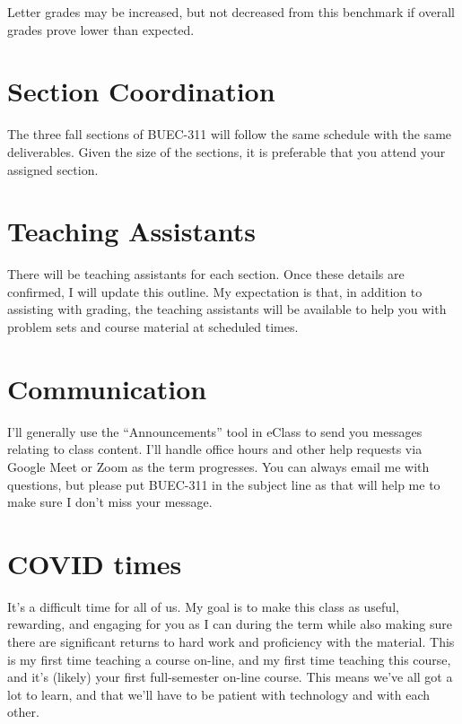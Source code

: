 \documentclass[11pt,]{article}
\begin{document}
Letter grades may be increased, but not decreased from this benchmark if
overall grades prove lower than expected.

\hypertarget{section-coordination}{%
\section{Section Coordination}\label{section-coordination}}

The three fall sections of BUEC-311 will follow the same schedule with
the same deliverables. Given the size of the sections, it is preferable
that you attend your assigned section.

\hypertarget{teaching-assistants}{%
\section{Teaching Assistants}\label{teaching-assistants}}

There will be teaching assistants for each section. Once these details
are confirmed, I will update this outline. My expectation is that, in
addition to assisting with grading, the teaching assistants will be
available to help you with problem sets and course material at scheduled
times.

\hypertarget{communication}{%
\section{Communication}\label{communication}}

I'll generally use the ``Announcements'' tool in eClass to send you
messages relating to class content. I'll handle office hours and other
help requests via Google Meet or Zoom as the term progresses. You can
always email me with questions, but please put BUEC-311 in the subject
line as that will help me to make sure I don't miss your message.

\hypertarget{covid-times}{%
\section{COVID times}\label{covid-times}}

It's a difficult time for all of us. My goal is to make this class as
useful, rewarding, and engaging for you as I can during the term while
also making sure there are significant returns to hard work and
proficiency with the material. This is my first time teaching a course
on-line, and my first time teaching this course, and it's (likely) your
first full-semester on-line course. This means we've all got a lot to
learn, and that we'll have to be patient with technology and with each
other.
\end{document}
